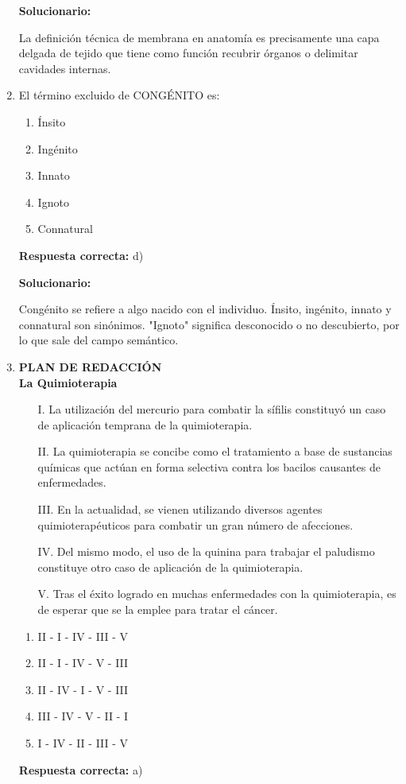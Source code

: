 \begin{enumerate}[resume]
	\vspace{2mm}
	\textbf{Solucionario:}

	La definición técnica de membrana en anatomía es precisamente una capa delgada de tejido que tiene como función recubrir órganos o delimitar cavidades internas.

	\vspace{6mm}

	\item El término excluido de CONGÉNITO es:
	\begin{enumerate}[label=\alph*)]
		\item Ínsito
		\item Ingénito
		\item Innato
		\item Ignoto
		\item Connatural
	\end{enumerate}
	\textbf{Respuesta correcta:} d)

	\vspace{2mm}
	\textbf{Solucionario:}

	Congénito se refiere a algo nacido con el individuo. Ínsito, ingénito, innato y connatural son sinónimos. "Ignoto" significa desconocido o no descubierto, por lo que sale del campo semántico.

	\vspace{6mm}

	\item \textbf{PLAN DE REDACCIÓN}\\
	\textbf{La Quimioterapia}
	\begin{itemize}
		\item[I.] La utilización del mercurio para combatir la sífilis constituyó un caso de aplicación temprana de la quimioterapia.
		\item[II.] La quimioterapia se concibe como el tratamiento a base de sustancias químicas que actúan en forma selectiva contra los bacilos causantes de enfermedades.
		\item[III.] En la actualidad, se vienen utilizando diversos agentes quimioterapéuticos para combatir un gran número de afecciones.
		\item[IV.] Del mismo modo, el uso de la quinina para trabajar el paludismo constituye otro caso de aplicación de la quimioterapia.
		\item[V.] Tras el éxito logrado en muchas enfermedades con la quimioterapia, es de esperar que se la emplee para tratar el cáncer.
	\end{itemize}
	\begin{enumerate}[label=\alph*)]
		\item II - I - IV - III - V
		\item II - I - IV - V - III
		\item II - IV - I - V - III
		\item III - IV - V - II - I
		\item I - IV - II - III - V
	\end{enumerate}
	\textbf{Respuesta correcta:} a)


\end{enumerate}
